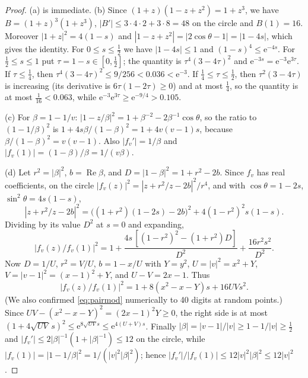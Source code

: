 \documentclass[11pt]{article}
\theoremstyle{remark}\newtheorem{remark}[theorem]{Remark}
\newcommand{\Rea}{\operatorname{Re}}
\newcommand{\ee}{\mathrm e}
\begin{document}
\begin{proof}
(a) is immediate. (b) Since \((1+z)(1-z+z^2)=1+z^3\), we have
\(B=(1+z)^3(1+z^3)\), \(|B'|\le3\cdot4\cdot2+3\cdot8=48\) on the circle and
\(B(1)=16\). Moreover \(|1+z|^2=4(1-s)\) and
\(|1-z+z^2|=|2\cos\theta-1|=|1-4s|\), which gives the identity.
For \(0\le s\le\frac12\) we have \(|1-4s|\le1\) and
\((1-s)^4\le\ee^{-4s}\). For \(\frac12\le s\le1\) put \(\tau=1-s\in[0,\frac12]\);
the quantity is \(\tau^4(3-4\tau)^2\) and \(\ee^{-3s}=\ee^{-3}\ee^{3\tau}\).
If \(\tau\le\frac14\), then \(\tau^4(3-4\tau)^2\le9/256<0.036<\ee^{-3}\).
If \(\frac14\le\tau\le\frac12\), then \(\tau^2(3-4\tau)\) is increasing
(its derivative is \(6\tau(1-2\tau)\ge0\)) and at most \(\frac14\), so the
quantity is at most \(\frac1{16}<0.063\), while
\(\ee^{-3}\ee^{3\tau}\ge\ee^{-9/4}>0.105\).

(c) For \(\beta=1-1/v\): \(|1-z/\beta|^2=1+\beta^{-2}-2\beta^{-1}\cos\theta\),
so the ratio to \((1-1/\beta)^2\) is
\(1+4s\beta/(1-\beta)^2=1+4v(v-1)s\), because
\(\beta/(1-\beta)^2=v(v-1)\). Also \(|f_v'|=1/\beta\) and
\(|f_v(1)|=(1-\beta)/\beta=1/(v\beta)\).

(d) Let \(r^2=|\beta|^2\), \(b=\Rea\beta\), and
\(D=|1-\beta|^2=1+r^2-2b\). Since \(f_v\) has real coefficients, on
the circle \(|f_v(z)|^2=|z+r^2/z-2b|^2/r^4\), and with
\(\cos\theta=1-2s\), \(\sin^2\theta=4s(1-s)\),
\[
 |z+r^2/z-2b|^2=\bigl((1+r^2)(1-2s)-2b\bigr)^2+4(1-r^2)^2s(1-s).
\]
Dividing by its value \(D^2\) at \(s=0\) and expanding,
\[
 |f_v(z)/f_v(1)|^2=1+\frac{4s\,[(1-r^2)^2-(1+r^2)D]}{D^2}
   +\frac{16r^2s^2}{D^2}.
\]
Now \(D=1/U\), \(r^2=V/U\), \(b=1-x/U\) with \(Y=y^2\),
\(U=|v|^2=x^2+Y\), \(V=|v-1|^2=(x-1)^2+Y\), and \(U-V=2x-1\). Thus
\begin{equation}\label{eq:pairmod}
 |f_v(z)/f_v(1)|^2=1+8(x^2-x-Y)s+16UVs^2 .
\end{equation}
(We also confirmed \eqref{eq:pairmod} numerically to 40 digits at random points.)
Since \(UV-(x^2-x-Y)^2=(2x-1)^2Y\ge0\), the right side is at most
\((1+4\sqrt{UV}\,s)^2\le\ee^{8\sqrt{UV}s}\le\ee^{4(U+V)s}\).
Finally \(|\beta|=|v-1|/|v|\ge1-1/|v|\ge\frac12\) and
\(|f_v'|\le2|\beta|^{-1}(1+|\beta|^{-1})\le12\) on the circle, while
\(|f_v(1)|=|1-1/\beta|^2=1/(|v|^2|\beta|^2)\); hence
\(|f_v'|/|f_v(1)|\le12|v|^2|\beta|^2\le12|v|^2\).
\end{proof}
\end{document}
